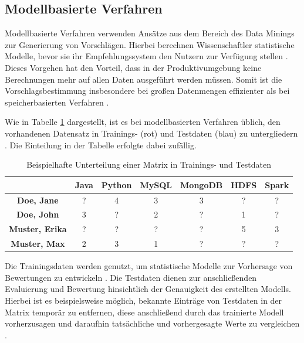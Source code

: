 \subsection{Modellbasierte Verfahren}
\label{ch:empfehlungssysteme:cf:modellbasiert}
Modellbasierte Verfahren verwenden Ansätze aus dem Bereich des Data Minings zur Generierung von Vorschlägen. Hierbei berechnen Wissenschaftler statistische Modelle, bevor sie ihr Empfehlungssystem den Nutzern zur Verfügung stellen \cite[S. 2]{cui:2020}. Dieses Vorgehen hat den Vorteil, dass in der Produktivumgebung keine Berechnungen mehr auf allen Daten ausgeführt werden müssen. Somit ist die Vorschlagsbestimmung insbesondere bei großen Datenmengen effizienter als bei speicherbasierten Verfahren \cite[S. 8]{yang:2016}.

Wie in Tabelle \ref{tbl:empfehlungssysteme:cf:modellbasiert:tbl1} dargestellt, ist es bei modellbasierten Verfahren üblich, den vorhandenen Datensatz in Trainings- (rot) und Testdaten (blau) zu untergliedern \cite[S. 71f.]{recommenderSystems:2016}. Die Einteilung in der Tabelle erfolgte dabei zufällig.

\begin{table}[h]
	\centering
	\begin{tabular}{c|c|c|c|c|c|c}
		& \textbf{Java} & \textbf{Python} & \textbf{MySQL} & \textbf{MongoDB} & \textbf{HDFS} & \textbf{Spark}\\ 
		\hline
		\textbf{Doe, Jane} & ? & \cellcolor{itemcolor}4 & \cellcolor{itemcolor}3 & \cellcolor{usercolor}3 & ? & ?\\
		\textbf{Doe, John} & \cellcolor{itemcolor}3 & ? & \cellcolor{usercolor}2 & ? & \cellcolor{usercolor}1 & ?\\
		\textbf{Muster, Erika} & ? & ? & ? & ? & \cellcolor{itemcolor}5 & \cellcolor{usercolor}3\\
		\textbf{Muster, Max} & \cellcolor{itemcolor}2 & \cellcolor{usercolor}3 & \cellcolor{itemcolor}1 & ? & ? & ?\\
	\end{tabular}
	\caption{Beispielhafte Unterteilung einer Matrix in Trainings- und Testdaten}
	\label{tbl:empfehlungssysteme:cf:modellbasiert:tbl1}
\end{table}

Die Trainingsdaten werden genutzt, um statistische Modelle zur Vorhersage von Bewertungen zu entwickeln \cite[S. 71f.]{recommenderSystems:2016}. Die Testdaten dienen zur anschließenden Evaluierung und Bewertung hinsichtlich der Genauigkeit des erstellten Modells. Hierbei ist es beispielsweise möglich, bekannte Einträge von Testdaten in der Matrix temporär zu entfernen, diese anschließend durch das trainierte Modell vorherzusagen und daraufhin tatsächliche und vorhergesagte Werte zu vergleichen \cite[S. 3ff.]{kang:2016}.

